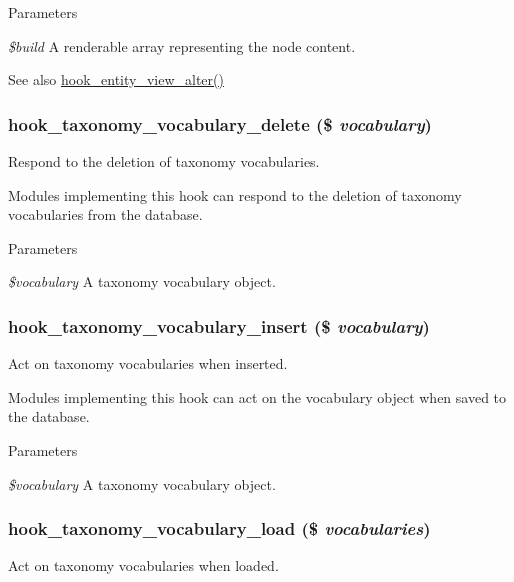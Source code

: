 \begin{DoxyParams}{Parameters}
\item[{\em \$build}]A renderable array representing the node content.\end{DoxyParams}
\begin{DoxySeeAlso}{See also}
\hyperlink{group__hooks_ga2c2be6c70815b426f0eb13b0b68edb40}{hook\_\-entity\_\-view\_\-alter()} 
\end{DoxySeeAlso}
\hypertarget{group__hooks_ga76a12ce251cd46c0b33f73a190f77d8d}{
\subsubsection[{hook\_\-taxonomy\_\-vocabulary\_\-delete}]{\setlength{\rightskip}{0pt plus 5cm}hook\_\-taxonomy\_\-vocabulary\_\-delete (\$ {\em vocabulary})}}
\label{group__hooks_ga76a12ce251cd46c0b33f73a190f77d8d}
Respond to the deletion of taxonomy vocabularies.

Modules implementing this hook can respond to the deletion of taxonomy vocabularies from the database.


\begin{DoxyParams}{Parameters}
\item[{\em \$vocabulary}]A taxonomy vocabulary object. \end{DoxyParams}
\hypertarget{group__hooks_ga438bdb494fe8b75625b9451e94165065}{
\subsubsection[{hook\_\-taxonomy\_\-vocabulary\_\-insert}]{\setlength{\rightskip}{0pt plus 5cm}hook\_\-taxonomy\_\-vocabulary\_\-insert (\$ {\em vocabulary})}}
\label{group__hooks_ga438bdb494fe8b75625b9451e94165065}
Act on taxonomy vocabularies when inserted.

Modules implementing this hook can act on the vocabulary object when saved to the database.


\begin{DoxyParams}{Parameters}
\item[{\em \$vocabulary}]A taxonomy vocabulary object. \end{DoxyParams}
\hypertarget{group__hooks_ga2426242aecd7bc83f3201d2e87093b5c}{
\subsubsection[{hook\_\-taxonomy\_\-vocabulary\_\-load}]{\setlength{\rightskip}{0pt plus 5cm}hook\_\-taxonomy\_\-vocabulary\_\-load (\$ {\em vocabularies})}}
\label{group__hooks_ga2426242aecd7bc83f3201d2e87093b5c}
Act on taxonomy vocabularies when loaded.

